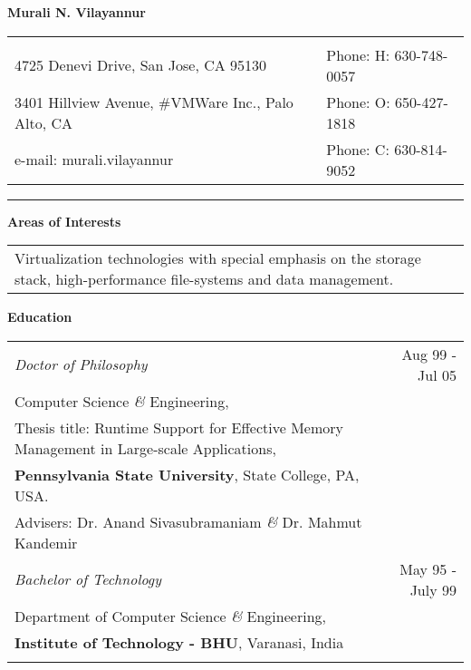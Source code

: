 \documentclass{article}
\begin{document}
  \Large
  \textbf{Murali N. Vilayannur}
  \newline
  \small
  \begin{tabularx}{\linewidth}{XX}
	&\\
	4725 Denevi Drive, San Jose, CA 95130 & Phone: H: 630-748-0057 \\
  	3401 Hillview Avenue, \#VMWare Inc., Palo Alto, CA & Phone: O: 650-427-1818 \\
  	e-mail: murali.vilayannur\verb1@1gmail.com & Phone: C: 630-814-9052 \\
  \end{tabularx}
  \hrule
  \normalsize
  

  \large \textbf{Areas of Interests}
  \normalsize
  \vspace*{-0.1truein}
  \begin{center}
  \begin{tabularx}{6.2in}{X}
	Virtualization technologies with special emphasis on the storage stack, high-performance
        file-systems and data management.
  \end{tabularx}
  \end{center}

\vspace*{-0.1truein}
  \large \textbf{Education}
  \normalsize
  \vspace*{-0.1truein}
  \begin{center}
  \begin{tabularx}{6.2in}{Xr}
	\emph {Doctor of Philosophy} & Aug 99 - Jul 05\\
	\small
	Computer Science \emph{\&} Engineering,& \\
	Thesis title: Runtime Support for Effective Memory Management in Large-scale Applications,&\\
	\textbf{Pennsylvania State University}, State College, PA, USA. &\\
	Advisers: Dr. Anand Sivasubramaniam \emph{\&} Dr. Mahmut Kandemir & \\
	\normalsize
\vspace*{-0.1truein}
	\emph {Bachelor of Technology} & May 95 - July 99\\
	\small
	Department of Computer Science \emph{\&} Engineering, &\\
	\textbf{Institute of Technology - BHU}, Varanasi, India & \\
	\normalsize
  \end{tabularx}
  \end{center}
\end{document}

